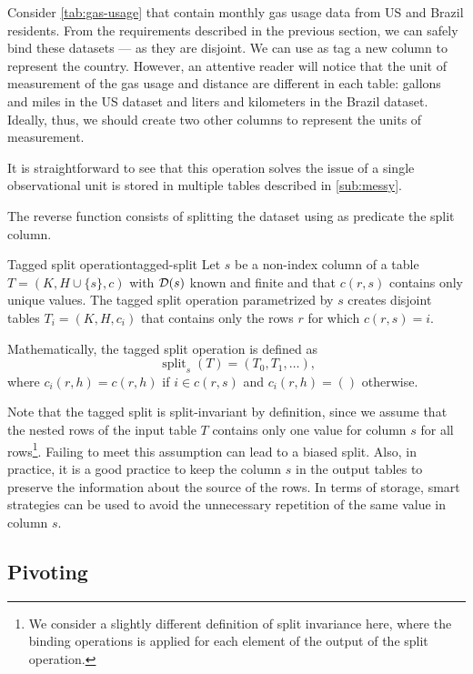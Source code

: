 Consider \cref{tab:gas-usage} that contain monthly gas usage data from
US and Brazil residents.  From the requirements described in the previous section, we can
safely bind these datasets --- as they are disjoint.  We can use as tag a new column to
represent the country.  However, an attentive reader will notice that the unit of
measurement of the gas usage and distance are different in each table: gallons and miles
in the US dataset and liters and kilometers in the Brazil dataset.  Ideally, thus, we
should create two other columns to represent the units of measurement.

It is straightforward to see that this operation solves the issue of a single
observational unit is stored in multiple tables described in \cref{sub:messy}.

The reverse function consists of splitting the dataset using as predicate the split column.

\begin{defbox}{Tagged split operation}{tagged-split}
  Let $s$ be a non-index column of a table $T = (K, H \cup \{s\}, c)$ with $\mathcal{D}\!\left(s\right)$
  known and finite and that $c(r, s)$ contains only unique values. The tagged split
  operation parametrized by $s$ creates disjoint tables $T_i = (K, H, c_i)$ that contains
  only the rows $r$ for which $c(r, s) = i$.

  Mathematically, the tagged split operation is defined as \[
    \operatorname{split}_{s}(T) = \left(T_0, T_1, \dots\right)\text{,}
  \] where $c_i(r, h) = c(r, h)$ if $i \in c(r, s)$ and $c_i(r, h) = ()$ otherwise.
\end{defbox}

Note that the tagged split is split-invariant by definition, since we assume that the
nested rows of the input table $T$ contains only one value for column $s$ for all
rows\footnote{We consider a slightly different definition of split invariance here, where
the binding operations is applied for each element of the output of the split operation.}.
Failing to meet this assumption can lead to a biased split.  Also, in practice, it is a
good practice to keep the column $s$ in the output tables to preserve the information
about the source of the rows.  In terms of storage, smart strategies can be used to
avoid the unnecessary repetition of the same value in column $s$.

\subsection{Pivoting}

